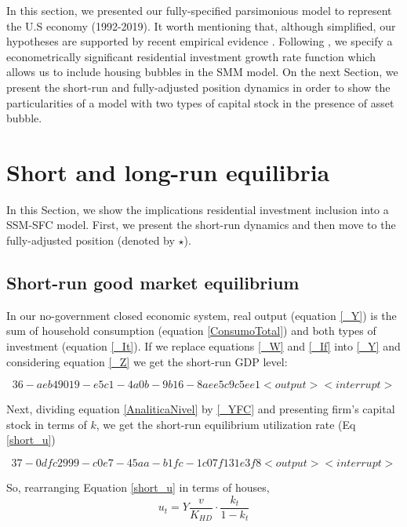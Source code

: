 \documentclass[11pt]{article}
\begin{document}
In this section, we presented our fully-specified parsimonious model to represent the U.S economy (1992-2019). It worth mentioning that, although simplified, our hypotheses are supported by recent empirical evidence \cites{albanesi_credit_2017}. Following \textcites{teixeira_crescimento_2015}{petrini_demanda_2019}, we specify a econometrically significant residential investment growth rate function which allows us to include housing bubbles in the SMM model. On the next Section, we present the short-run and fully-adjusted position dynamics in order to show the particularities of a model with two types of capital stock in the presence of asset bubble.



\section{Short and long-run equilibria}
\label{sec:org74057c3}
\label{sec:runs}
In this Section, we show the implications residential investment inclusion into a SSM-SFC model. First, we present the short-run dynamics and then move to the fully-adjusted position (denoted by \(\star\)).
\subsection{Short-run good market equilibrium}
\label{sec:orgb498722}
\label{short}

In our no-government closed economic system, real output (equation \ref{_Y}) is the sum of household consumption (equation \ref{ConsumoTotal}) and both types of investment (equation \ref{_It}). 
If we replace equations \ref{_W} and  \ref{_If} into \ref{_Y} and considering equation \ref{_Z} we get the short-run GDP level:



\begin{equation}
\label{AnaliticaNivel}
36 - aeb49019-e5c1-4a0b-9b16-8aee5c9c5ee1 <output> <interrupt>
\end{equation}

Next, dividing equation \ref{AnaliticaNivel} by \ref{_YFC} and presenting firm's capital stock in terms of \(k\), we get the short-run equilibrium utilization rate (Eq \ref{short_u})


\begin{equation}
\label{short_u}
37 - 0dfc2999-c0e7-45aa-b1fc-1c07f131e3f8 <output> <interrupt>
\end{equation}

So, rearranging Equation \ref{short_u} in terms of houses,
$$
u_{t} = Y\frac{v}{K_{HD}}\cdot \frac{k_{t}}{1-k_{t}}
$$
\end{document}
